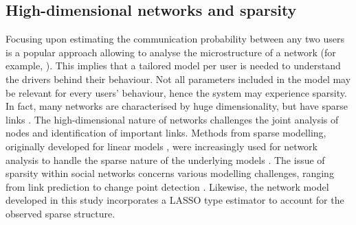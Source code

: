\subsection{High-dimensional networks and sparsity}
Focusing upon estimating the communication probability between any two users is a popular approach allowing to analyse the microstructure of a network (for example, \citet{agaskar2013alarm}). This implies that a tailored model per user is needed to understand the drivers behind their behaviour. Not all parameters included in the model may be relevant for every users' behaviour, hence the system may experience sparsity. In fact, many networks are characterised by huge dimensionality, but have sparse links \citep{paula_econometrics_2017}. The high-dimensional nature of networks challenges the joint analysis of nodes and identification of important links. Methods from sparse modelling, originally developed for linear models \citep{tibshirani_regression_1996, fan_variable_2001, zou_adaptive_2006}, were increasingly used for network analysis to handle the sparse nature of the underlying models \citep{Barigozzi2019, Trimborn2022a, Trimborn2022, Zhang2023}. The issue of sparsity within social networks concerns various modelling challenges, ranging from link prediction \citep{Trimborn2022} to change point detection \citep{chen2024monitoring}. Likewise, the network model developed in this study incorporates a LASSO type estimator \citep{tibshirani_regression_1996} to account for the observed sparse structure. 
